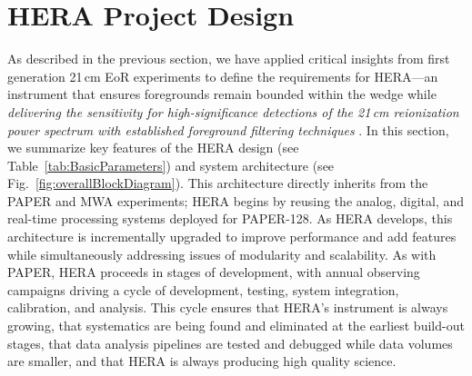 \documentclass[preprint,11pt]{aastex}
\begin{document}

\vspace{-18pt}
\section{HERA Project Design} \label{sec:design}
\vspace{-5pt}

\noindent As described in the previous section, we have applied 
critical insights from first generation 21\,cm EoR experiments to define
the requirements for HERA---an instrument that ensures foregrounds remain bounded
within the wedge while \emph{delivering the sensitivity for
high-significance detections of the 21\,cm reionization power spectrum with
established foreground filtering techniques} 
\citep{pober_et_al2014,greig_and_mesinger2015}.
In this section, we summarize key features of the HERA design (see Table~\ref{tab:BasicParameters}) 
and system architecture (see Fig.~\ref{fig:overallBlockDiagram}).
This architecture
directly inherits from the PAPER and MWA experiments; HERA begins by reusing the
analog, digital, and real-time processing systems deployed for PAPER-128.  As HERA develops, this
architecture is incrementally upgraded to improve performance and add features while simultaneously
addressing issues of modularity and scalability.  As with PAPER, HERA proceeds in stages of development,
with annual observing campaigns driving a cycle of development, testing, system integration, calibration, and analysis.
This cycle ensures that HERA's instrument is always growing, that systematics are being found and eliminated at the
earliest build-out stages, that data analysis pipelines are tested and debugged while data volumes are smaller,
and that HERA is always producing high quality science.
\end{document}
